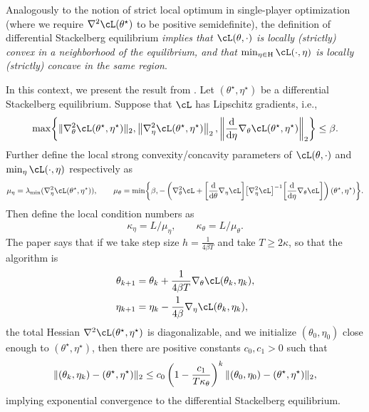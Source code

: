 \documentclass[../../book-main.tex]{subfiles}
\begin{document}
Analogously to the notion of strict local optimum in single-player optimization (where we require \(\nabla^{2}\cL(\theta^{\star})\) to be positive semidefinite), the definition of differential Stackelberg equilibrium \textit{implies that \(\cL(\theta, \cdot)\) is locally (strictly) convex in a neighborhood of the equilibrium, and that \(\min_{\eta \in \Eta}\cL(\cdot, \eta)\) is locally (strictly) concave in the same region}.

In this context, we present the result from \cite{li2022convergence}. Let \((\theta^{\star}, \eta^{\star})\) be a differential Stackelberg equilibrium. Suppose that \(\cL\) has Lipschitz gradients, i.e.,
\begin{equation}
    \max\rc{\norm{\nabla_{\theta}^{2}\cL(\theta^{\star}, \eta^{\star})}_{2}, \norm*{\nabla_{\eta}^{2}\cL(\theta^{\star}, \eta^{\star})}_{2},  \norm*{\odv*{\nabla_{\theta}\cL(\theta^{\star}, \eta^{\star})}{\eta}}_{2}} \leq \beta.
\end{equation}
Further define the local strong convexity/concavity parameters of \(\cL(\theta, \cdot)\) and \(\min_{\eta}\cL(\cdot, \eta)\) respectively as
\begin{equation}
    \mu_{\eta} = \lambda_{\min}(\nabla_{\eta}^{2}\cL(\theta^{\star}, \eta^{\star})), \qquad \mu_{\theta} = \min\rc{\beta, -\bp{\nabla_{\theta}^{2}\cL + \rs{\odv*{\nabla_{\eta}\cL}{\theta}}\rs{\nabla_{\eta}^{2}\cL}^{-1}\rs{\odv*{\nabla_{\theta}\cL}{\eta}}}(\theta^{\star}, \eta^{\star})}.
\end{equation}
Then define the local condition numbers as 
\begin{equation}
    \kappa_{\eta} = L/\mu_{\eta}, \qquad \kappa_{\theta} = L/\mu_{\theta}.
\end{equation}
The paper \cite{li2022convergence} says that if we take step size \(h = \frac{1}{4\beta T}\) and take \(T \geq 2\kappa\), so that the algorithm is 
\begin{align}
    \theta_{k + 1}
    &= \theta_{k} + \frac{1}{4\beta T}\nabla_{\theta} \cL(\theta_{k}, \eta_{k}), \\
    \eta_{k + 1}
    &= \eta_{k} - \frac{1}{4\beta}\nabla_{\eta} \cL(\theta_{k}, \eta_{k}),
\end{align}
the total Hessian \(\nabla^{2}\cL(\theta^{\star}, \eta^{\star})\) is diagonalizable, and we initialize \((\theta_{0}, \eta_{0})\) close enough to \((\theta^{\star}, \eta^{\star})\), then there are positive constants \(c_{0}, c_{1} > 0\) such that 
\begin{equation}
    \norm{(\theta_{k}, \eta_{k}) - (\theta^{\star}, \eta^{\star})}_{2} \leq c_{0}\bp{1 - \frac{c_{1}}{T\kappa_{\theta}}}^{k}\norm{(\theta_{0}, \eta_{0}) - (\theta^{\star}, \eta^{\star})}_{2},
\end{equation}
implying exponential convergence to the differential Stackelberg equilibrium.
\end{document}
